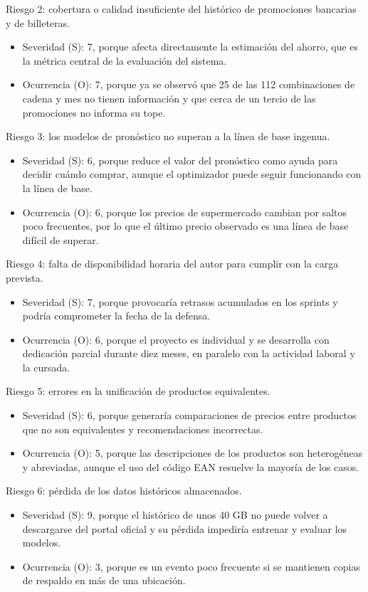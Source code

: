 \documentclass[
11pt, %
]{charter}
\begin{document}
Riesgo 2: cobertura o calidad insuficiente del histórico de promociones bancarias y de billeteras.
\begin{itemize}
	\item Severidad (S): 7, porque afecta directamente la estimación del ahorro, que es la métrica central de la evaluación del sistema.
	\item Ocurrencia (O): 7, porque ya se observó que 25 de las 112 combinaciones de cadena y mes no tienen información y que cerca de un tercio de las promociones no informa su tope.
\end{itemize}

Riesgo 3: los modelos de pronóstico no superan a la línea de base ingenua.
\begin{itemize}
	\item Severidad (S): 6, porque reduce el valor del pronóstico como ayuda para decidir cuándo comprar, aunque el optimizador puede seguir funcionando con la línea de base.
	\item Ocurrencia (O): 6, porque los precios de supermercado cambian por saltos poco frecuentes, por lo que el último precio observado es una línea de base difícil de superar.
\end{itemize}

Riesgo 4: falta de disponibilidad horaria del autor para cumplir con la carga prevista.
\begin{itemize}
	\item Severidad (S): 7, porque provocaría retrasos acumulados en los sprints y podría comprometer la fecha de la defensa.
	\item Ocurrencia (O): 6, porque el proyecto es individual y se desarrolla con dedicación parcial durante diez meses, en paralelo con la actividad laboral y la cursada.
\end{itemize}

Riesgo 5: errores en la unificación de productos equivalentes.
\begin{itemize}
	\item Severidad (S): 6, porque generaría comparaciones de precios entre productos que no son equivalentes y recomendaciones incorrectas.
	\item Ocurrencia (O): 5, porque las descripciones de los productos son heterogéneas y abreviadas, aunque el uso del código EAN resuelve la mayoría de los casos.
\end{itemize}

Riesgo 6: pérdida de los datos históricos almacenados.
\begin{itemize}
	\item Severidad (S): 9, porque el histórico de unos 40 GB no puede volver a descargarse del portal oficial y su pérdida impediría entrenar y evaluar los modelos.
	\item Ocurrencia (O): 3, porque es un evento poco frecuente si se mantienen copias de respaldo en más de una ubicación.
\end{itemize}
\end{document}
